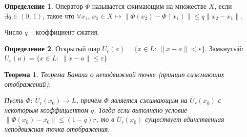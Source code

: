 \documentclass[a4paper,12pt]{article}
\renewcommand{\leq}{\ensuremath{\leqslant}}
\theoremstyle{plain}
\newtheorem{theorem}{Теорема}[section]
\theoremstyle{definition}
\newtheorem{definition}{Определение}[section]
\theoremstyle{remark}
\begin{document}
\begin{definition}
	Оператор $\Phi$ называется сжимающим на множестве $X$, если $\exists q \in (0,\,1)$, такое что $\forall x_1,\,x_2 \in X \mapsto \|\Phi(x_2) - \Phi(x_1)\| \leq q \|x_2 - x_1\|$.

	Число $q$ -- коэффициент сжатия.
\end{definition}

\begin{definition}
	Открытый шар $U_\varepsilon(a) = \{x \in L :\: \|x - a\| < \varepsilon\}$. Замкнутый: $\overline{U}_\varepsilon(a) = \{x \in L:\: \|x-a\|\leq\varepsilon\}$
\end{definition}

\begin{theorem}
	Теорема Банаха о неподвижной точке (принцип сижмающих отображений).

	Пусть $\Phi:\: \overline{U}_r(x_0) \to L$, причём $\Phi$ является сжимающим на $\overline{U}_r(x_0)$ с некоторым коэффициентом $q$. Тогда если выполнено условие $\|\Phi(x_0) - x_0\| \leq (1 - q)r$, то в $\overline{U}_r(x_0)$ существует единственная неподвижная точка отображения.
\end{theorem}
\end{document}
